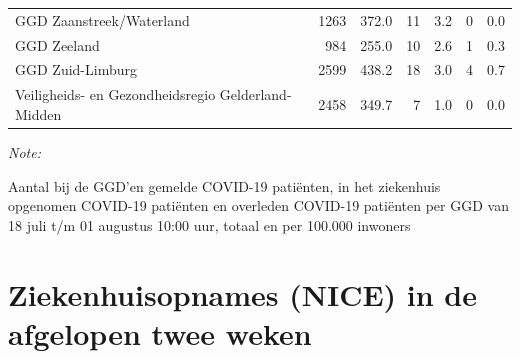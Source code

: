 \documentclass[
  english,
  man,floatsintext]{apa6}
\begin{document}
\begin{table}
\begin{threeparttable}
\begin{tabular}{lrrrrrr}
GGD Zaanstreek/Waterland & 1263 & 372.0 & 11 & 3.2 & 0 & 0.0\\
GGD Zeeland & 984 & 255.0 & 10 & 2.6 & 1 & 0.3\\
GGD Zuid-Limburg & 2599 & 438.2 & 18 & 3.0 & 4 & 0.7\\
Veiligheids- en Gezondheidsregio Gelderland-Midden & 2458 & 349.7 & 7 & 1.0 & 0 & 0.0\\
\bottomrule
\end{tabular}
\begin{tablenotes}
\item \textit{Note: } 
\item Aantal bij de GGD’en gemelde COVID-19 patiënten, in het ziekenhuis opgenomen COVID-19 patiënten en overleden COVID-19 patiënten per GGD van 18 juli t/m 01 augustus 10:00 uur, totaal en per 100.000 inwoners
\end{tablenotes}
\end{threeparttable}
\endgroup{}
\end{table}

\newpage

\hypertarget{ziekenhuisopnames-nice-in-de-afgelopen-twee-weken}{%
\section{Ziekenhuisopnames (NICE) in de afgelopen twee weken}\label{ziekenhuisopnames-nice-in-de-afgelopen-twee-weken}}
\end{document}
